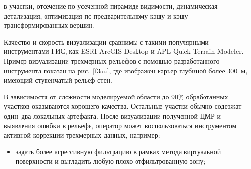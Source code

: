    \begin{multicols}{2}

\noindent
 в участки, отсечение по усеченной 
пирамиде видимости, динамическая детализация, оптимизация по 
предварительному кэшу и кэшу трансформированных вершин.
  
   
   Качество и скорость визуализации сравнимы с такими популярными 
инструментами ГИС, как ESRI ArcGIS Desktop и APL Quick Terrain Modeler. 
Пример визуализации трехмерных рельефов с помощью разработанного 
инструмента показан на рис.~\ref{f3su}, где изображен карьер глубиной более 
300~м, имеющий ступенчатый рельеф стен.
 
   В зависимости от сложности моделируемой области до 90\% обработанных 
участков оказываются хорошего качества. Остальные участки обычно содержат 
один--два локальных артефакта. После визуализации полученной ЦМР и 
выявления ошибки в рельефе, оператор может воспользоваться инструментом 
активной коррекции трехмерных данных, например:
   \begin{itemize}
\item задать более агрессивную фильтрацию в рамках метода виртуальной 
поверхности и выгладить любую плохо отфильтрованную зону;
\end{itemize}

\end{multicols}

\begin{figure} %
\vspace*{1pt}
\begin{center}
\vspace*{1pt}
\mbox{%
\epsfxsize=155.984mm
}
\end{center}
\vspace*{-9pt}
   \end{figure}
   
